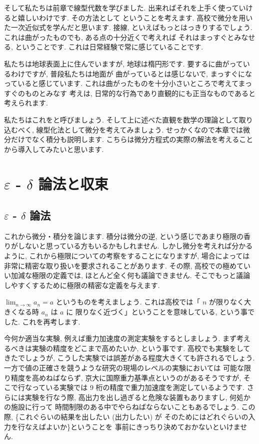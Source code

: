 \documentclass[openany, a4paper, oneside]{jsbook}
\begin{document}
そして私たちは前章で線型代数を学びました.
出来ればそれを上手く使っていけると嬉しいわけです.
その方法として
ということを考えます.
高校で微分を用いた一次近似式を学んだと思います.
接線, といえばもっとはっきりするでしょう.
これは曲がったものでも, ある点の十分近くで考えれば
それはまっすぐとみなせる, ということです.
これは日常経験で常に感じていることです.

私たちは地球表面上に住んでいますが, 地球は楕円形です.
要するに曲がっているわけですが, 普段私たちは地面が
曲がっているとは感じないで, まっすぐになっていると感じています.
これは曲がったものを十分小さいところで考えてまっすぐのものとみなす
考えは, 日常的な行為であり直観的にも正当なものであると考えられます.

私たちはこれをと呼びましょう.
そして上に述べた直観を数学の理論として取り込むべく,
線型化法として微分を考えてみましょう.
せっかくなので本章では微分だけでなく積分も説明します.
こちらは微分方程式の実際の解法を考えることから導入してみたいと思います.
\section{$\varepsilon$ - $\delta$ 論法と収束}

\subsection{$\varepsilon$ - $\delta$ 論法}

これから微分・積分を論じます.
積分は微分の逆, という感じであまり極限の香りがしないと思っている方もいるかもしれません.
しかし微分を考えれば分かるように, これから極限についての考察をすることになりますが,
場合によっては非常に精密な取り扱いを要求されることがあります.
その際, 高校での極めていい加減な極限の定義では, ほとんど全く何も議論できません.
そこでもっと議論しやすくするために極限の精密な定義を与えます.

 $\lim_{n \to \infty}a_n=a$ というものを考えましょう.
これは高校では「 $n$ が限りなく大きくなる時 $a_n$ は $a$ に
限りなく近づく」ということを意味している, という事でした.
これを再考します.

今何か適当な実験, 例えば重力加速度の測定実験をするとしましょう.
まず考えるべきは実験の精度をどこまで高めたいか, という事です.
高校でも実験をしてきたでしょうが,
こうした実験では誤差がある程度大きくても許されるでしょう.
一方で値の正確さを競うような研究の現場のレベルの実験においては
可能な限り精度を高めねばならず, 京大に国際重力基準点というのがあるそうですが,
そこで行なっている実験では 9 桁の精度で重力加速度を測定しているようです.
さらには実験を行なう際,
高出力を出し過ぎると危険な装置もありますし, 何処かの施設に行って
時間制限のある中でやらねばならないこともあるでしょう.
この際, \textgt\{これぐらいの結果を出したい (出力したい) が
そのためにはどれぐらいの入力を行なえばよいか\}ということを
事前にきっちり決めておかないといけません.
\end{document}
